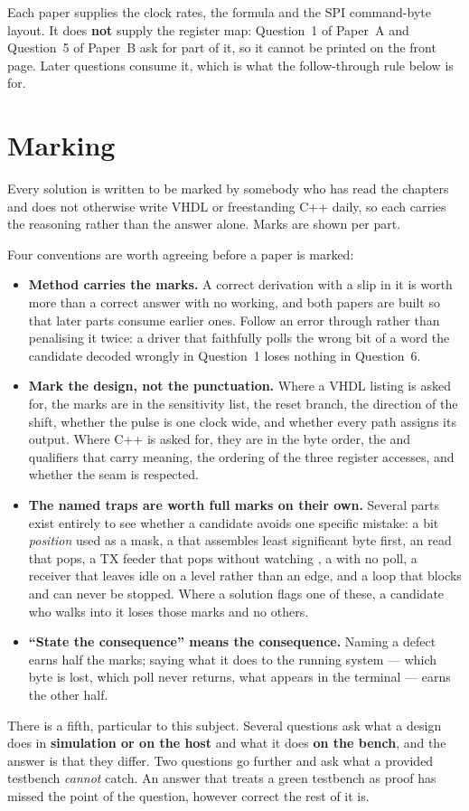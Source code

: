 Each paper supplies the clock rates, the  formula and the SPI command-byte layout.
It does \textbf{not} supply the register map: Question~1 of Paper~A and Question~5 of Paper~B ask for part of it,
so it cannot be printed on the front page. Later questions consume it, which is what the follow-through
rule below is for.

\section*{Marking}
Every solution is written to be marked by somebody who has read the chapters and does not otherwise
write VHDL or freestanding C++ daily, so each carries the reasoning rather than the answer alone.
Marks are shown per part.

Four conventions are worth agreeing before a paper is marked:
\begin{itemize}
  \item \textbf{Method carries the marks.} A correct derivation with a slip in it is worth more than
    a correct answer with no working, and both papers are built so that later parts consume earlier
    ones. Follow an error through rather than penalising it twice: a driver that faithfully polls
    the wrong bit of a  word the candidate decoded wrongly in Question~1 loses nothing
    in Question~6.
  \item \textbf{Mark the design, not the punctuation.} Where a VHDL listing is asked for, the marks
    are in the sensitivity list, the reset branch, the direction of the shift, whether the pulse is
    one clock wide, and whether every path assigns its output. Where C++ is asked for, they are in
    the byte order, the  and  qualifiers that carry meaning, the ordering
    of the three register accesses, and whether the seam is respected.
  \item \textbf{The named traps are worth full marks on their own.} Several parts exist entirely to
    see whether a candidate avoids one specific mistake: a bit \emph{position} used as a mask, a
     that assembles least significant byte first, an  read that pops, a
    TX feeder that pops without watching , a  with no  poll, a
    receiver that leaves idle on a level rather than an edge, and a  loop that blocks
    and can never be stopped. Where a solution flags one of these, a candidate who walks into it
    loses those marks and no others.
  \item \textbf{``State the consequence'' means the consequence.} Naming a defect earns half the
    marks; saying what it does to the running system --- which byte is lost, which poll never
    returns, what appears in the terminal --- earns the other half.
\end{itemize}

There is a fifth, particular to this subject. Several questions ask what a design does in
\textbf{simulation or on the host} and what it does \textbf{on the bench}, and the answer is that
they differ. Two questions go further and ask what a provided testbench \emph{cannot} catch. An
answer that treats a green testbench as proof has missed the point of the question, however correct
the rest of it is.
